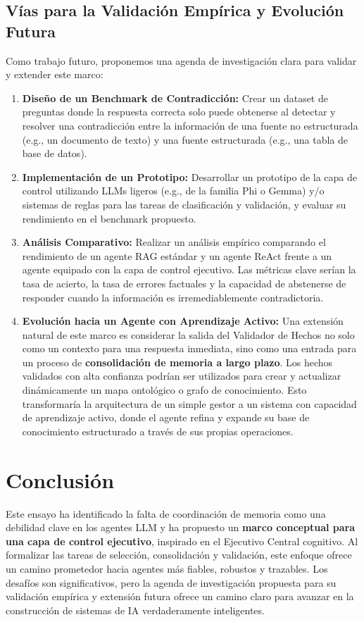 \documentclass[journal,onecolumn]{IEEEtran}
\begin{document}
\subsection{Vías para la Validación Empírica y Evolución Futura}
Como trabajo futuro, proponemos una agenda de investigación clara para validar y extender este marco:
\begin{enumerate}
    \item \textbf{Diseño de un Benchmark de Contradicción:} Crear un dataset de preguntas donde la respuesta correcta solo puede obtenerse al detectar y resolver una contradicción entre la información de una fuente no estructurada (e.g., un documento de texto) y una fuente estructurada (e.g., una tabla de base de datos).
    \item \textbf{Implementación de un Prototipo:} Desarrollar un prototipo de la capa de control utilizando LLMs ligeros (e.g., de la familia Phi o Gemma) y/o sistemas de reglas para las tareas de clasificación y validación, y evaluar su rendimiento en el benchmark propuesto.
    \item \textbf{Análisis Comparativo:} Realizar un análisis empírico comparando el rendimiento de un agente RAG estándar y un agente ReAct frente a un agente equipado con la capa de control ejecutivo. Las métricas clave serían la tasa de acierto, la tasa de errores factuales y la capacidad de abstenerse de responder cuando la información es irremediablemente contradictoria.
    \item \textbf{Evolución hacia un Agente con Aprendizaje Activo:} Una extensión natural de este marco es considerar la salida del Validador de Hechos no solo como un contexto para una respuesta inmediata, sino como una entrada para un proceso de \textbf{consolidación de memoria a largo plazo}. Los hechos validados con alta confianza podrían ser utilizados para crear y actualizar dinámicamente un mapa ontológico o grafo de conocimiento. Esto transformaría la arquitectura de un simple gestor a un sistema con capacidad de aprendizaje activo, donde el agente refina y expande su base de conocimiento estructurado a través de sus propias operaciones.
\end{enumerate}

\section{Conclusión}
Este ensayo ha identificado la falta de coordinación de memoria como una debilidad clave en los agentes LLM y ha propuesto un \textbf{marco conceptual para una capa de control ejecutivo}, inspirado en el Ejecutivo Central cognitivo. Al formalizar las tareas de selección, consolidación y validación, este enfoque ofrece un camino prometedor hacia agentes más fiables, robustos y trazables. Los desafíos son significativos, pero la agenda de investigación propuesta para su validación empírica y extensión futura ofrece un camino claro para avanzar en la construcción de sistemas de IA verdaderamente inteligentes.
\end{document}
